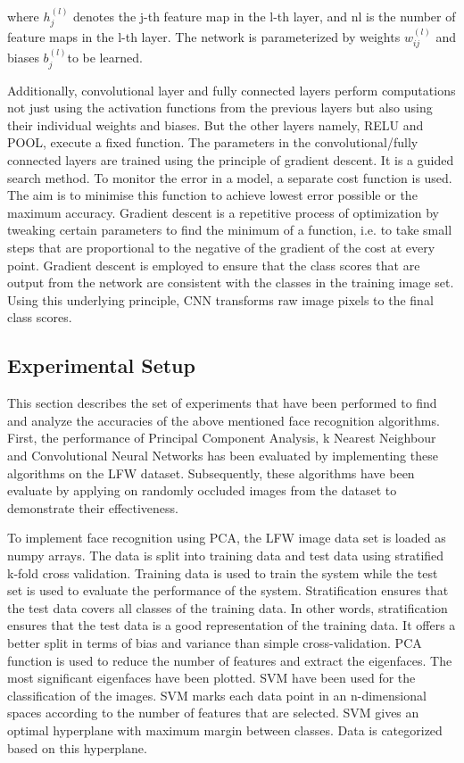 \documentclass[conference]{IEEEtran}
\begin{document}
where $h^{(l)}_j$ denotes the j-th feature map in the l-th layer, and nl is the number of feature maps in the l-th layer. The network is parameterized by weights $w_{ij}^{(l)}$ and biases $b_j^{(l)}$to be learned\cite{lee2009convolutional}.

Additionally, convolutional layer and fully connected layers perform computations not just using the activation functions from the previous layers but also using their individual weights and biases. But the other layers namely, RELU and POOL, execute a  fixed function. The parameters in the convolutional/fully connected layers are trained using the principle of gradient descent. It is a guided search method. To monitor the error in a model, a separate cost function is used. The aim is to minimise this function to achieve lowest error possible or the maximum accuracy. Gradient descent is a repetitive process of optimization by tweaking certain parameters to find the minimum of a function, i.e. to take small steps that are proportional to the negative of the gradient of the cost at every point. Gradient descent is employed to ensure that the class scores that are output from the network are consistent with the classes in the training image set. Using this underlying principle, CNN transforms raw image pixels to the final class scores. 

\subsection{Experimental Setup}
\label{subsec: 3b. Experimental Setup}


This section describes the set of experiments that have been performed to find and analyze the accuracies of the above mentioned face recognition algorithms. First, the performance of Principal Component Analysis, k Nearest Neighbour and Convolutional Neural Networks has been evaluated by implementing these algorithms on the LFW dataset. Subsequently, these algorithms have been evaluate by applying on randomly occluded images from the dataset to demonstrate their effectiveness.

To implement face recognition using PCA, the LFW image data set is loaded as numpy arrays. The data is split into training data and test data using stratified k-fold cross validation. Training data is used to train the system while the test set is used to evaluate the performance of the system. Stratification ensures that the test data covers all classes of the training data. In other words, stratification ensures that the test data is a good representation of the training data. It offers a better split in terms of bias and variance than simple cross-validation. PCA function is used to reduce the number of features and extract the eigenfaces. The most significant eigenfaces have been plotted. SVM have been used for the classification of the images. SVM marks each data point in an n-dimensional spaces according to the number of features that are selected. SVM gives an optimal hyperplane with maximum margin between classes. Data is categorized based on this hyperplane.
\end{document}
